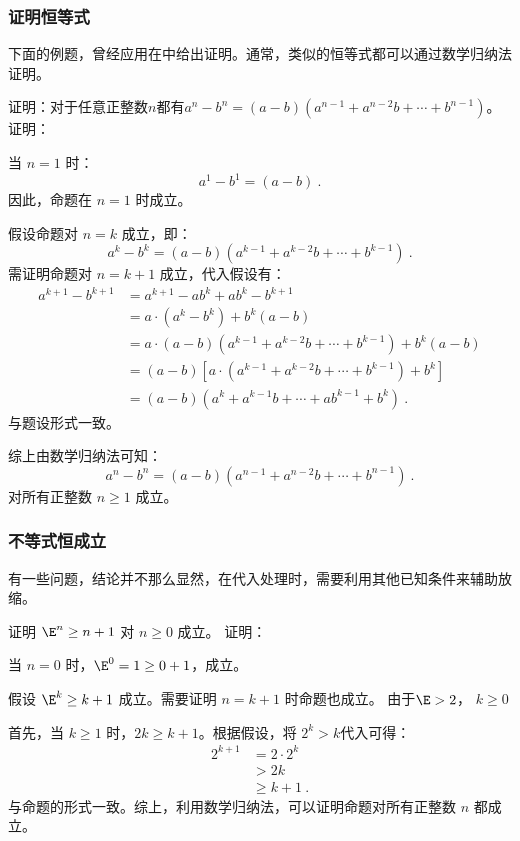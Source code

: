 \subsubsection{证明恒等式}
下面的例题，曾经应用在中给出证明。通常，类似的恒等式都可以通过数学归纳法证明。
\begin{example}{证明：对于任意正整数$n$都有$a^n-b^n=\left(a-b\right)\left(a^{n-1}+a^{n-2}b+\cdots+b^{n-1}\right)$。}
证明：

当 $n = 1$ 时：
\begin{equation}
a^1 - b^1 = (a - b)~.
\end{equation}
因此，命题在 $n = 1$ 时成立。

假设命题对 $n = k$ 成立，即：
\begin{equation}
a^k - b^k = (a - b)\left(a^{k-1} + a^{k-2}b + \cdots + b^{k-1}\right)~.
\end{equation}
需证明命题对 $n = k+1$ 成立，代入假设有：
\begin{equation}
\begin{aligned}
a^{k+1} - b^{k+1} &= a^{k+1}-ab^k+ab^k - b^{k+1}\\
&= a \cdot (a^k - b^k) + b^k(a - b)\\
&=a \cdot (a - b)\left(a^{k-1} + a^{k-2}b + \cdots + b^{k-1}\right) + b^k(a - b)\\
&=(a - b)\left[a \cdot \left(a^{k-1} + a^{k-2}b + \cdots + b^{k-1}\right) + b^k\right]\\
&=(a - b)\left(a^{k} + a^{k-1}b + \cdots + ab^{k-1} + b^k\right)~.
\end{aligned}
\end{equation}
与题设形式一致。

综上由数学归纳法可知：
\begin{equation}
a^n - b^n = (a - b)\left(a^{n-1} + a^{n-2}b + \cdots + b^{n-1}\right)~.
\end{equation}
对所有正整数 $n \geq 1$ 成立。
\end{example}

\subsubsection{不等式恒成立}

有一些问题，结论并不那么显然，在代入处理时，需要利用其他已知条件来辅助放缩。

\begin{example}{证明 $\E^n \geq n+1$ 对 $n \geq 0$ 成立。}
证明：

当 $n = 0$ 时，$\E^0 = 1\geq 0+1$，成立。

假设 $\E^k \geq k+1$ 成立。需要证明 $n = k+1$ 时命题也成立。
由于$\E>2$，
$k\geq0$

首先，当 $k \geq 1$ 时，$2k \geq k+1$。根据假设，将 $2^k > k$代入可得：
\begin{equation}
\begin{aligned}
2^{k+1} &= 2 \cdot 2^k\\
&> 2k\\
&\geq k+1~.
\end{aligned}
\end{equation}
与命题的形式一致。综上，利用数学归纳法，可以证明命题对所有正整数 $n$ 都成立。
\end{example}

